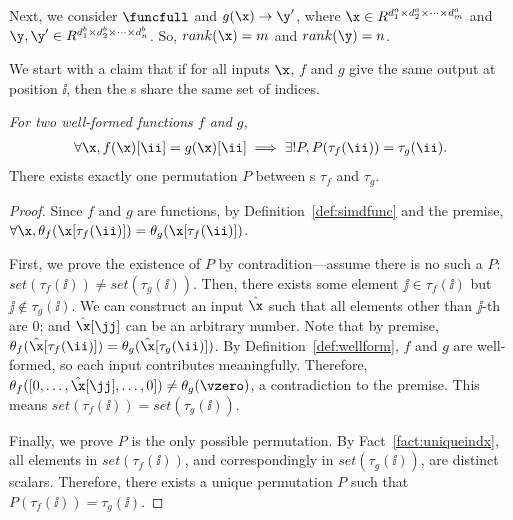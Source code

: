\noindent
Next, we consider $\funcfull$ and $g(\x) \to \y'$,
where $\x \in R^{d_1^a\times d_2^a \times \dots \times d_m^a}$
and $\y,\y' \in R^{d_1^b\times d_2^b \times \dots \times d_n^b}$.
So, $rank(\x)=m$ and $rank(\y)=n$.




We start with a claim that if for all inputs $\x$,
$f$ and $g$ give the same output at position $\ii$,
then the \depmap{}s share the same set of indices.

\begin{claim}
\emph{For two well-formed \simd{} functions $f$ and $g$,}
\begin{align*}
    \forall \x, f(\x)[\ii]=g(\x)[\ii] \implies \exists! P, P(\tau_f(\ii)) = \tau_g(\ii).
\end{align*}
    There exists exactly one permutation $P$ between \depmap{}s $\tau_f$ and $\tau_g$.
    \label{claim:set}
\end{claim}


\begin{proof}
    Since $f$ and $g$ are \simd{} functions,
    by Definition~\ref{def:simdfunc} and the premise,
    $\forall \x, \theta_f(\x[\tau_f(\ii)]) = \theta_g(\x[\tau_f(\ii)])$.


    First, we prove the existence of $P$ by contradition---assume
    there is no such a $P$: $set(\tau_f(\ii)) \neq set(\tau_g(\ii))$.
    Then, there exists some element
    $\jj \in \tau_f(\ii)$ but $\jj \not\in \tau_g(\ii)$.
    We can construct an input $\hat{\x}$ such that
    all elements other than $\jj$-th are $0$; and $\hat{\x}[\jj]$
    can be an arbitrary number.
    Note that by premise, $\theta_f(\hat{\x}[\tau_f(\ii)]) = \theta_g(\hat{\x}[\tau_g(\ii)])$.
    By Definition~\ref{def:wellform}, $f$ and $g$ are well-formed,
    so each input contributes meaningfully.
    Therefore, $\theta_f([0,\dots,\hat{\x}[\jj],\dots,0]) \neq \theta_g(\vzero)$,
    a contradiction to the premise.
    This means $set(\tau_f(\ii)) = set(\tau_g(\ii))$.

    Finally, we prove $P$ is the only possible permutation.
    By Fact~\ref{fact:uniqueindx},
    all elements in $set(\tau_f(\ii))$, and correspondingly in $set(\tau_g(\ii))$, are distinct scalars.
    Therefore, there exists a unique permutation $P$ such that
    $P(\tau_f(\ii)) = \tau_g(\ii)$.
\end{proof}

